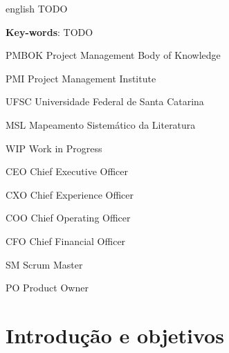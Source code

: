 \documentclass[
    12pt,       %
    openright,      %
    twoside,      %
    a4paper,      %
    english,      %
    french,       %
    spanish,      %
    brazil,       %
    ]{abntex2}
\begin{document}
  \begin{resumo}[Abstract]
   \begin{otherlanguage*}{english}
TODO
     \vspace{\onelineskip}

     \noindent
     \textbf{Key-words}: TODO
   \end{otherlanguage*}
  \end{resumo}

  \listoffigures*
  \cleardoublepage

  \listoftables*
  \cleardoublepage

  \begin{siglas}
    \item[PMBOK] Project Management Body of Knowledge
    \item[PMI]  Project Management Institute
    \item[UFSC] Universidade Federal de Santa Catarina
    \item[MSL] Mapeamento Sistemático da Literatura
    \item[WIP] Work in Progress
    \item[CEO] Chief Executive Officer
    \item[CXO] Chief Experience Officer
    \item[COO] Chief Operating Officer
    \item[CFO] Chief Financial Officer
    \item[SM] Scrum Master
    \item[PO] Product Owner

 \end{siglas}

  \tableofcontents*
  \cleardoublepage



  \textual


\chapter{Introdução e objetivos}
\label{sec:Introducao}
\end{document}
